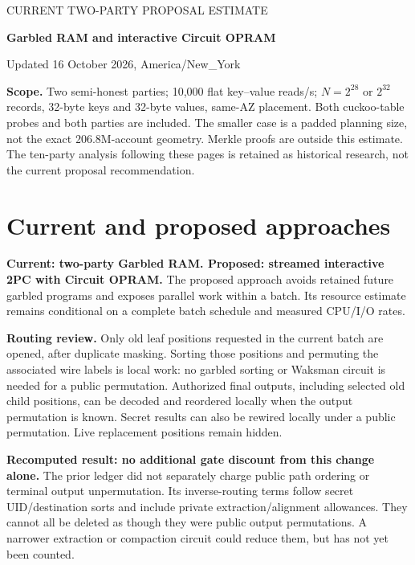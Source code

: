 {\color{teal}\large CURRENT TWO-PARTY PROPOSAL ESTIMATE}\par
{\color{navy}\LARGE\bfseries Garbled RAM and interactive Circuit OPRAM}\par
Updated 16 October 2026, America/New\_York\par
\textbf{Scope.} Two semi-honest parties; 10,000 flat key--value reads/s;
$N=2^{28}$ or $2^{32}$ records, 32-byte keys and 32-byte values, same-AZ
placement. Both cuckoo-table probes and both parties are included. The smaller
case is a padded planning size, not the exact 206.8M-account geometry. Merkle
proofs are outside this estimate. The ten-party analysis following these pages
is retained as historical research, not the current proposal recommendation.

\section{Current and proposed approaches}
\textbf{Current: two-party Garbled RAM. Proposed: streamed interactive 2PC
with Circuit OPRAM.} The proposed approach avoids retained future garbled
programs and exposes parallel work within a batch. Its resource estimate
remains conditional on a complete batch schedule and measured CPU/I/O rates.

\textbf{Routing review.} Only old leaf positions requested in the current batch
are opened, after duplicate masking. Sorting those positions and permuting the
associated wire labels is local work: no garbled sorting or Waksman circuit is
needed for a public permutation. Authorized final outputs, including selected
old child positions, can be decoded and reordered locally when the output
permutation is known. Secret results can also be rewired locally under a public
permutation. Live replacement positions remain hidden.

\textbf{Recomputed result: no additional gate discount from this change alone.}
The prior ledger did not separately charge public path ordering or terminal
output unpermutation. Its inverse-routing terms follow secret UID/destination
sorts and include private extraction/alignment allowances. They cannot all be
deleted as though they were public output permutations. A narrower extraction
or compaction circuit could reduce them, but has not yet been counted.


